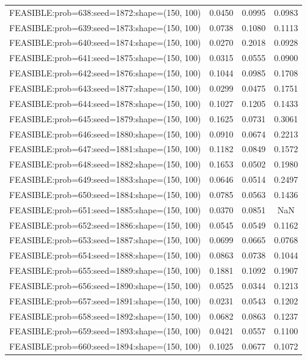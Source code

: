 \begin{longtable}{lccc}
FEASIBLE:prob=638:seed=1872:shape=(150, 100) & 0.0450 & 0.0995 & 0.0983 \\
FEASIBLE:prob=639:seed=1873:shape=(150, 100) & 0.0738 & 0.1080 & 0.1113 \\
FEASIBLE:prob=640:seed=1874:shape=(150, 100) & 0.0270 & 0.2018 & 0.0928 \\
FEASIBLE:prob=641:seed=1875:shape=(150, 100) & 0.0315 & 0.0555 & 0.0900 \\
FEASIBLE:prob=642:seed=1876:shape=(150, 100) & 0.1044 & 0.0985 & 0.1708 \\
FEASIBLE:prob=643:seed=1877:shape=(150, 100) & 0.0299 & 0.0475 & 0.1751 \\
FEASIBLE:prob=644:seed=1878:shape=(150, 100) & 0.1027 & 0.1205 & 0.1433 \\
FEASIBLE:prob=645:seed=1879:shape=(150, 100) & 0.1625 & 0.0731 & 0.3061 \\
FEASIBLE:prob=646:seed=1880:shape=(150, 100) & 0.0910 & 0.0674 & 0.2213 \\
FEASIBLE:prob=647:seed=1881:shape=(150, 100) & 0.1182 & 0.0849 & 0.1572 \\
FEASIBLE:prob=648:seed=1882:shape=(150, 100) & 0.1653 & 0.0502 & 0.1980 \\
FEASIBLE:prob=649:seed=1883:shape=(150, 100) & 0.0646 & 0.0514 & 0.2497 \\
FEASIBLE:prob=650:seed=1884:shape=(150, 100) & 0.0785 & 0.0563 & 0.1436 \\
FEASIBLE:prob=651:seed=1885:shape=(150, 100) & 0.0370 & 0.0851 &    NaN \\
FEASIBLE:prob=652:seed=1886:shape=(150, 100) & 0.0545 & 0.0549 & 0.1162 \\
FEASIBLE:prob=653:seed=1887:shape=(150, 100) & 0.0699 & 0.0665 & 0.0768 \\
FEASIBLE:prob=654:seed=1888:shape=(150, 100) & 0.0863 & 0.0738 & 0.1044 \\
FEASIBLE:prob=655:seed=1889:shape=(150, 100) & 0.1881 & 0.1092 & 0.1907 \\
FEASIBLE:prob=656:seed=1890:shape=(150, 100) & 0.0525 & 0.0344 & 0.1213 \\
FEASIBLE:prob=657:seed=1891:shape=(150, 100) & 0.0231 & 0.0543 & 0.1202 \\
FEASIBLE:prob=658:seed=1892:shape=(150, 100) & 0.0682 & 0.0863 & 0.1237 \\
FEASIBLE:prob=659:seed=1893:shape=(150, 100) & 0.0421 & 0.0557 & 0.1100 \\
FEASIBLE:prob=660:seed=1894:shape=(150, 100) & 0.1025 & 0.0677 & 0.1072 \\

\end{longtable}
